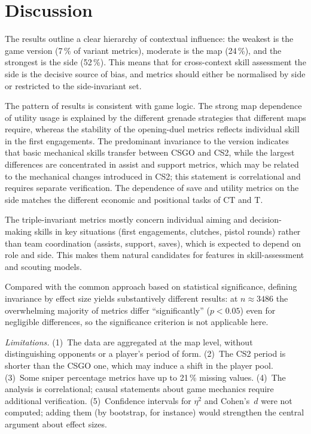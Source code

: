 \section{Discussion}

The results outline a clear hierarchy of contextual influence: the weakest is the game version
(7\,\% of variant metrics), moderate is the map (24\,\%), and the strongest is the side
(52\,\%). This means that for cross-context skill assessment the side is the decisive source of
bias, and metrics should either be normalised by side or restricted to the side-invariant set.

The pattern of results is consistent with game logic. The strong map dependence of utility usage
is explained by the different grenade strategies that different maps require, whereas the
stability of the opening-duel metrics reflects individual skill in the first engagements. The
predominant invariance to the version indicates that basic mechanical skills transfer between
CSGO and CS2, while the largest differences are concentrated in assist and support metrics, which
may be related to the mechanical changes introduced in CS2; this statement is correlational and
requires separate verification. The dependence of save and utility metrics on the side matches
the different economic and positional tasks of CT and T.

The triple-invariant metrics mostly concern individual aiming and decision-making skills in key
situations (first engagements, clutches, pistol rounds) rather than team coordination (assists,
support, saves), which is expected to depend on role and side. This makes them natural candidates
for features in skill-assessment and scouting models.

Compared with the common approach based on statistical significance, defining invariance by
effect size yields substantively different results: at $n \approx 3486$ the overwhelming majority
of metrics differ ``significantly'' ($p < 0.05$) even for negligible differences, so the
significance criterion is not applicable here.

\textit{Limitations.} (1)~The data are aggregated at the map level, without distinguishing
opponents or a player's period of form. (2)~The CS2 period is shorter than the CSGO one, which may
induce a shift in the player pool. (3)~Some sniper percentage metrics have up to 21\,\% missing
values. (4)~The analysis is correlational; causal statements about game mechanics require
additional verification. (5)~Confidence intervals for $\eta^2$ and Cohen's~$d$ were not computed;
adding them (by bootstrap, for instance) would strengthen the central argument about effect sizes.

